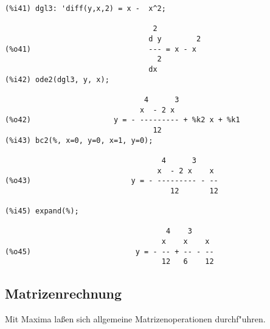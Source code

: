 \documentclass[spanish,12pt,a4paper]{article}
\begin{document}
\scriptsize
\begin{verbatim}
(%i41) dgl3: 'diff(y,x,2) = x -  x^2;

                                  2
                                 d y        2
(%o41)                           --- = x - x
                                   2
                                 dx
(%i42) ode2(dgl3, y, x);

                                4      3
                               x  - 2 x
(%o42)                   y = - --------- + %k2 x + %k1
                                  12
(%i43) bc2(%, x=0, y=0, x=1, y=0);

                                    4      3
                                   x  - 2 x    x
(%o43)                       y = - --------- - --
                                      12       12

(%i45) expand(%);

                                     4    3
                                    x    x    x
(%o45)                        y = - -- + -- - --
                                    12   6    12
\end{verbatim}
\normalsize

\subsection{Matrizenrechnung}

Mit Maxima la{\ss}en sich allgemeine Matrizenoperationen durchf"uhren.
\end{document}
